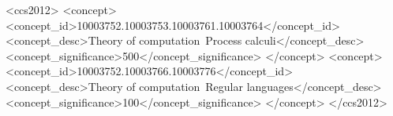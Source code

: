 \documentclass[sigplan,preprint,screen,anonymous,review,submission,timestamp,urlbreakonhyphens,%
                                                                                             ]{acmart}
\begin{document}
\renewcommand{\shortauthors}{C. Grabmayer}

\begin{abstract}
  
  
%   
%   
%   
%   
%   
%   
  
  
\end{abstract}

\begin{CCSXML}
<ccs2012>
<concept>
<concept_id>10003752.10003753.10003761.10003764</concept_id>
<concept_desc>Theory of computation~Process calculi</concept_desc>
<concept_significance>500</concept_significance>
</concept>
<concept>
<concept_id>10003752.10003766.10003776</concept_id>
<concept_desc>Theory of computation~Regular languages</concept_desc>
<concept_significance>100</concept_significance>
</concept>
</ccs2012>
\end{CCSXML}

% 
\end{document}
